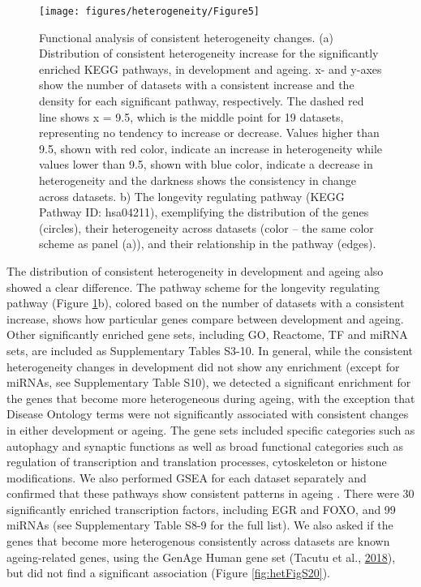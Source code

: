 \documentclass[12pt,twoside]{unicam}
\begin{document}
\begin{figure}

{\centering \texttt{[image: figures/heterogeneity/Figure5]} 

}

\caption[Functional analysis of consistent heterogeneity changes.]{Functional analysis of consistent heterogeneity changes. (a) Distribution of consistent heterogeneity increase for the significantly enriched KEGG pathways, in development and ageing. x- and y-axes show the number of datasets with a consistent increase and the density for each significant pathway, respectively. The dashed red line shows x = 9.5, which is the middle point for 19 datasets, representing no tendency to increase or decrease. Values higher than 9.5, shown with red color, indicate an increase in heterogeneity while values lower than 9.5, shown with blue color, indicate a decrease in heterogeneity and the darkness shows the consistency in change across datasets. b) The longevity regulating pathway (KEGG Pathway ID: hsa04211), exemplifying the distribution of the genes (circles), their heterogeneity across datasets (color – the same color scheme as panel (a)), and their relationship in the pathway (edges).}\label{fig:hetFig5}
\end{figure}

The distribution of consistent heterogeneity in development and ageing also showed a clear difference. The pathway scheme for the longevity regulating pathway (Figure \ref{fig:hetFig5}b), colored based on the number of datasets with a consistent increase, shows how particular genes compare between development and ageing. Other significantly enriched gene sets, including GO, Reactome, TF and miRNA sets, are included as Supplementary Tables S3-10. In general, while the consistent heterogeneity changes in development did not show any enrichment (except for miRNAs, see Supplementary Table S10), we detected a significant enrichment for the genes that become more heterogeneous during ageing, with the exception that Disease Ontology terms were not significantly associated with consistent changes in either development or ageing. The gene sets included specific categories such as autophagy and synaptic functions as well as broad functional categories such as regulation of transcription and translation processes, cytoskeleton or histone modifications. We also performed GSEA for each dataset separately and confirmed that these pathways show consistent patterns in ageing
. There were 30 significantly enriched transcription factors, including EGR and FOXO, and 99 miRNAs (see Supplementary Table S8-9 for the full list). We also asked if the genes that become more heterogenous consistently across datasets are known ageing-related genes, using the GenAge Human gene set (Tacutu et al., \protect\hyperlink{ref-Tacutu2018}{2018}), but did not find a significant association (Figure \ref{fig:hetFigS20}).
\end{document}
